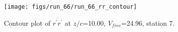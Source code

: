 \begin{figure}[H]
\centering
\texttt{[image: figs/run\_66/run\_66\_rr\_contour]}
\caption{Contour plot of $\overline{r^\prime r^\prime}$ at $z/c$=10.00, $V_{free}$=24.96, station 7.}
\label{fig:run_66_rr_contour}
\end{figure}


